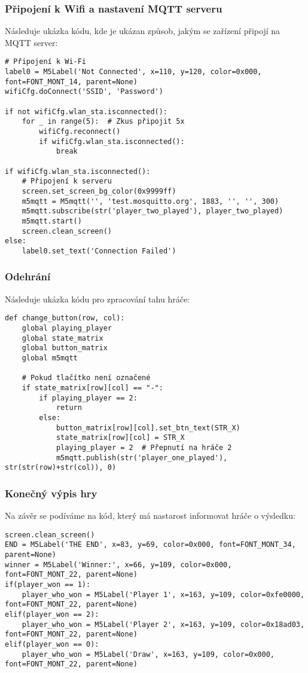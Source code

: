 \documentclass[a4paper,12pt]{article}
\begin{document}
\subsubsection{Připojení k Wifi a nastavení MQTT serveru}
Následuje ukázka kódu, kde je ukázan způsob, jakým se zařízení připojí na MQTT server:
\begin{lstlisting}
# Připojení k Wi-Fi
label0 = M5Label('Not Connected', x=110, y=120, color=0x000, font=FONT_MONT_14, parent=None)
wifiCfg.doConnect('SSID', 'Password')

if not wifiCfg.wlan_sta.isconnected():
    for _ in range(5):  # Zkus připojit 5x
        wifiCfg.reconnect()
        if wifiCfg.wlan_sta.isconnected():
            break

if wifiCfg.wlan_sta.isconnected():
    # Připojení k serveru
    screen.set_screen_bg_color(0x9999ff)
    m5mqtt = M5mqtt('', 'test.mosquitto.org', 1883, '', '', 300)
    m5mqtt.subscribe(str('player_two_played'), player_two_played)
    m5mqtt.start()
    screen.clean_screen()
else:
    label0.set_text('Connection Failed')
\end{lstlisting}
\subsubsection{Odehrání}
Následuje ukázka kódu pro zpracování tahu hráče:
\begin{lstlisting}
def change_button(row, col):
    global playing_player
    global state_matrix
    global button_matrix
    global m5mqtt
    
    # Pokud tlačítko není označené
    if state_matrix[row][col] == "-":
        if playing_player == 2:
            return
        else:
            button_matrix[row][col].set_btn_text(STR_X)
            state_matrix[row][col] = STR_X
            playing_player = 2  # Přepnutí na hráče 2
            m5mqtt.publish(str('player_one_played'), str(str(row)+str(col)), 0)
\end{lstlisting}
\newpage
\subsubsection{Konečný výpis hry}
Na závěr se podíváme na kód, který má nastarost informovat hráče o výsledku:
\begin{lstlisting}
screen.clean_screen()
END = M5Label('THE END', x=83, y=69, color=0x000, font=FONT_MONT_34, parent=None)
winner = M5Label('Winner:', x=66, y=109, color=0x000, font=FONT_MONT_22, parent=None)
if(player_won == 1):
    player_who_won = M5Label('Player 1', x=163, y=109, color=0xfe0000, font=FONT_MONT_22, parent=None)
elif(player_won == 2):
    player_who_won = M5Label('Player 2', x=163, y=109, color=0x18ad03, font=FONT_MONT_22, parent=None)
elif(player_won == 0):
    player_who_won = M5Label('Draw', x=163, y=109, color=0x000, font=FONT_MONT_22, parent=None)
\end{lstlisting}
\end{document}
